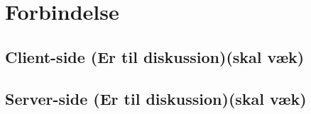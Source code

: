 \chapter{Forbindelse}

\section{Client-side (Er til diskussion)(skal væk)}

\section{Server-side (Er til diskussion)(skal væk)}

